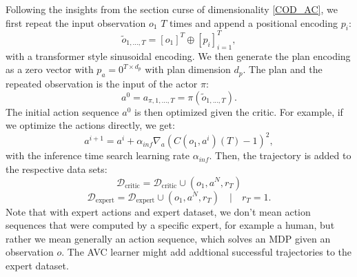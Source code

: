 Following the insights from the section curse of dimensionality \ref{COD_AC}, we first repeat the input observation $o_1$ $T$ times and append a positional encoding $p_i$:
\begin{equation}
    \label{eq:seq_emb}
    \tilde{o}_{1, ..., T} = [o_1]^T \oplus [p_i]_{i=1}^T,
\end{equation}
with a transformer style sinusoidal encoding.
We then generate the plan encoding as a zero vector with $p_a = 0^{T \times d_p}$ with plan dimension $d_p$. The plan and the repeated observation is the input 
of the actor $\pi$:
\begin{equation}
    a^0 = a_{\pi, 1,...,T} = \pi(\tilde{o}_{1, ..., T}).
\end{equation}
The initial action sequence $a^0$ is then optimized given the critic. For example, if we optimize the actions directly, we get:
\begin{equation*}
    a^{i+1} = a^i + \alpha_{inf}\nabla_{a} (C(o_1, a^i)(T) - 1)^2,
\end{equation*}
with the inference time search learning rate $\alpha_{inf}$. Then, the trajectory is added to the respective data sets:
\begin{equation}
    \mathcal{D}_{\text{critic}} = \mathcal{D}_{\text{critic}} \cup (o_1, a^N, r_T)
\end{equation}
\begin{equation*}
    \mathcal{D}_{\text{expert}} = \mathcal{D}_{\text{expert}} \cup (o_1, a^N, r_T)\quad |\quad r_T = 1.
\end{equation*}
Note that with expert actions and expert dataset, we don't mean action sequences that were computed by 
a specific expert, for example a human, but rather we mean generally an action sequence, which solves an MDP given an observation $o$. The AVC learner might add 
addtional successful trajectories to the expert dataset. \\


